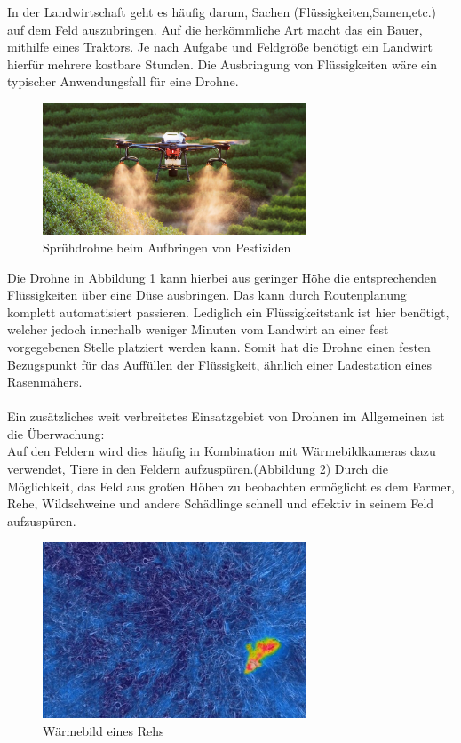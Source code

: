 In der Landwirtschaft geht es häufig darum, Sachen (Flüssigkeiten,Samen,etc.)
auf dem Feld auszubringen. Auf die herkömmliche Art macht das ein Bauer,
mithilfe eines Traktors. Je nach Aufgabe und Feldgröße benötigt ein Landwirt
hierfür mehrere kostbare Stunden. Die Ausbringung von Flüssigkeiten wäre ein
typischer Anwendungsfall für eine Drohne.

\begin{figure}[ht]
	\centering
	\includegraphics[width=0.7\textwidth]{bilder/drtohne.jpg}
	\caption[Sprühdrohne]{Sprühdrohne beim Aufbringen von Pestiziden \cite{Drohne}}
	\label{fig:sprühdrohne}
\end{figure}

Die Drohne in Abbildung \ref{fig:sprühdrohne} kann hierbei aus geringer Höhe
die entsprechenden Flüssigkeiten über eine Düse ausbringen. Das kann durch
Routenplanung komplett automatisiert passieren. Lediglich ein Flüssigkeitstank
ist hier benötigt, welcher jedoch innerhalb weniger Minuten vom Landwirt an
einer fest vorgegebenen Stelle platziert werden kann. Somit hat die Drohne
einen festen Bezugspunkt für das Auffüllen der Flüssigkeit, ähnlich einer
Ladestation eines Rasenmähers. \\ \\Ein zusätzliches weit verbreitetes
Einsatzgebiet von Drohnen im Allgemeinen ist die Überwachung: \\Auf den Feldern
wird dies häufig in Kombination mit Wärmebildkameras dazu verwendet, Tiere in
den Feldern aufzuspüren.(Abbildung \ref{fig:rehkitz}) Durch die Möglichkeit,
das Feld aus großen Höhen zu beobachten ermöglicht es dem Farmer, Rehe,
Wildschweine und andere Schädlinge schnell und effektiv in seinem Feld
aufzuspüren.

\begin{figure}[ht]
	\centering
	\includegraphics[width=0.7\textwidth]{bilder/rteh.jpg}
	\caption[Wärmebild eines Rehs]{Wärmebild eines Rehs \cite{reh}}
	\label{fig:rehkitz}
\end{figure}